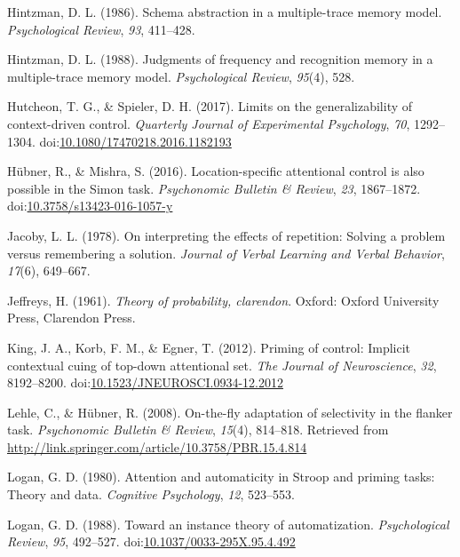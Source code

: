 \documentclass[english,,man,floatsintext]{apa6}
\begin{document}
\leavevmode\hypertarget{ref-hintzman_schema_1986}{}%
Hintzman, D. L. (1986). Schema abstraction in a multiple-trace memory model. \emph{Psychological Review}, \emph{93}, 411--428.

\leavevmode\hypertarget{ref-hintzman_judgments_1988}{}%
Hintzman, D. L. (1988). Judgments of frequency and recognition memory in a multiple-trace memory model. \emph{Psychological Review}, \emph{95}(4), 528.

\leavevmode\hypertarget{ref-hutcheon_limits_2017}{}%
Hutcheon, T. G., \& Spieler, D. H. (2017). Limits on the generalizability of context-driven control. \emph{Quarterly Journal of Experimental Psychology}, \emph{70}, 1292--1304. doi:\href{https://doi.org/10.1080/17470218.2016.1182193}{10.1080/17470218.2016.1182193}

\leavevmode\hypertarget{ref-hubner_location-specific_2016}{}%
Hübner, R., \& Mishra, S. (2016). Location-specific attentional control is also possible in the Simon task. \emph{Psychonomic Bulletin \& Review}, \emph{23}, 1867--1872. doi:\href{https://doi.org/10.3758/s13423-016-1057-y}{10.3758/s13423-016-1057-y}

\leavevmode\hypertarget{ref-jacoby_interpreting_1978}{}%
Jacoby, L. L. (1978). On interpreting the effects of repetition: Solving a problem versus remembering a solution. \emph{Journal of Verbal Learning and Verbal Behavior}, \emph{17}(6), 649--667.

\leavevmode\hypertarget{ref-jeffreys1961theory}{}%
Jeffreys, H. (1961). \emph{Theory of probability, clarendon}. Oxford: Oxford University Press, Clarendon Press.

\leavevmode\hypertarget{ref-king_priming_2012}{}%
King, J. A., Korb, F. M., \& Egner, T. (2012). Priming of control: Implicit contextual cuing of top-down attentional set. \emph{The Journal of Neuroscience}, \emph{32}, 8192--8200. doi:\href{https://doi.org/10.1523/JNEUROSCI.0934-12.2012}{10.1523/JNEUROSCI.0934-12.2012}

\leavevmode\hypertarget{ref-lehle_fly_2008}{}%
Lehle, C., \& Hübner, R. (2008). On-the-fly adaptation of selectivity in the flanker task. \emph{Psychonomic Bulletin \& Review}, \emph{15}(4), 814--818. Retrieved from \url{http://link.springer.com/article/10.3758/PBR.15.4.814}

\leavevmode\hypertarget{ref-logan_attention_1980}{}%
Logan, G. D. (1980). Attention and automaticity in Stroop and priming tasks: Theory and data. \emph{Cognitive Psychology}, \emph{12}, 523--553.

\leavevmode\hypertarget{ref-logan_toward_1988}{}%
Logan, G. D. (1988). Toward an instance theory of automatization. \emph{Psychological Review}, \emph{95}, 492--527. doi:\href{https://doi.org/10.1037/0033-295X.95.4.492}{10.1037/0033-295X.95.4.492}
\end{document}
